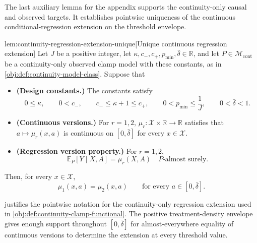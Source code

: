 The last auxiliary lemma for the appendix supports the continuity-only causal and observed targets. It establishes pointwise uniqueness of the continuous conditional-regression extension on the threshold envelope.

\begin{lemmav}{lem:continuity-regression-extension-unique}[Unique continuous regression extension]
Let \(J\) be a positive integer, let \(\kappa,c_-,c_+,p_{\min},\bar\delta\in\mathbb R\), and let \(P\in\mathcal M_{\mathrm{cont}}\) be a continuity-only observed clamp model with these constants, as in \cref{obj:def:continuity-model-class}. Suppose that
\begin{itemize}
\item \textbf{(Design constants.)} The constants satisfy
\[
0\leq \kappa,\qquad
0<c_-,\qquad
c_-\leq \kappa+1\leq c_+,\qquad
0<p_{\min}\leq \frac1J,\qquad
0<\bar\delta<1 .
\]
\item \textbf{(Continuous versions.)} For \(r=1,2\), \(\mu_r:\mathcal X\times\mathbb R\to\mathbb R\) satisfies that \(a\mapsto \mu_r(x,a)\) is continuous on \([0,\bar\delta]\) for every \(x\in\mathcal X\).
\item \textbf{(Regression version property.)} For \(r=1,2\),
\[
\mathbb E_P[Y\mid X,A]=\mu_r(X,A)
\quad\text{\(P\)-almost surely.}
\]
\end{itemize}
Then, for every \(x\in\mathcal X\),
\[
\mu_1(x,a)=\mu_2(x,a)
\qquad\text{for every }a\in[0,\bar\delta].
\]
\end{lemmav}

 justifies the pointwise notation for the continuity-only regression extension used in \cref{obj:def:continuity-clamp-functional}. The positive treatment-density envelope gives enough support throughout \([0,\bar\delta]\) for almost-everywhere equality of continuous versions to determine the extension at every threshold value.

